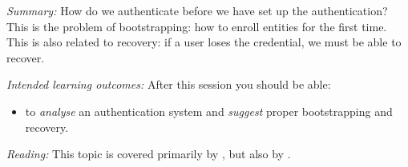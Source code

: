 \emph{Summary:}
How do we authenticate before we have set up the authentication?
This is the problem of bootstrapping: how to enroll entities for the first 
time.
This is also related to recovery: if a user loses the credential, we must be 
able to recover.

\emph{Intended learning outcomes:}
After this session you should be able:
\begin{itemize}
  \item to \emph{analyse} an authentication system and \emph{suggest} proper 
    bootstrapping and recovery.
\end{itemize}

\emph{Reading:}
This topic is covered primarily by \textcite{Gollmann2011cs}, but also by 
\textcite{Anderson2008sea}.

